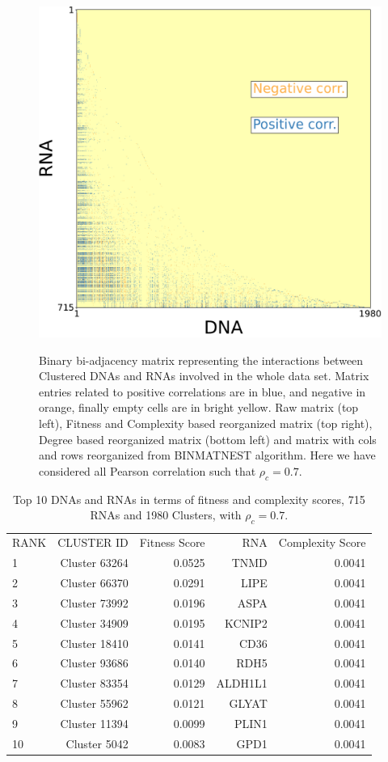 \documentclass[10pt,a4paper]{article}
\begin{document}
\begin{figure}[h!]
\begin{center}
{\includegraphics[width=0.5\columnwidth]{FIG/ADN_c-ARN_BINMATNEST-Matrix-sum-unit-0.7-PN.pdf}
}
\end{center}
\caption{\label{fig:fig1}Binary bi-adjacency matrix representing the interactions between Clustered DNAs and RNAs involved in the whole data set. Matrix entries related to positive correlations are in blue, and negative in orange, finally empty cells are in bright yellow. Raw matrix (top left), Fitness and Complexity based reorganized matrix (top right), Degree based reorganized matrix (bottom left) and matrix with cols and rows reorganized from BINMATNEST algorithm. Here we have considered all Pearson correlation such that $\rho_{c} = 0.7$.}
\end{figure}
 \begin{table}[h!]
\centering
\caption{\label{tab:tab1} Top 10 DNAs and RNAs in terms of fitness and complexity scores, 715 RNAs and 1980 Clusters, with $\rho_{c} = 0.7$.}
\begin{tabular}{l|rr|rr|}
\cline{1-5}
RANK & CLUSTER ID & Fitness Score & RNA & Complexity Score\\
\cline{1-5}
1 & Cluster 63264 & 0.0525 & TNMD & 0.0041\\
2 & Cluster 66370 & 0.0291 & LIPE & 0.0041\\
3 & Cluster 73992 & 0.0196 & ASPA & 0.0041\\
4 & Cluster 34909 & 0.0195 & KCNIP2 & 0.0041\\
5 & Cluster 18410 & 0.0141 & CD36 & 0.0041\\
6 & Cluster 93686 & 0.0140 & RDH5 & 0.0041\\
7 & Cluster 83354 & 0.0129 & ALDH1L1 & 0.0041\\
8 & Cluster 55962 & 0.0121 & GLYAT & 0.0041\\
9 & Cluster 11394 & 0.0099 & PLIN1 & 0.0041\\
10 & Cluster 5042 & 0.0083 & GPD1 & 0.0041\\
\cline{1-5}
\end{tabular}
\end{table}
\end{document}

